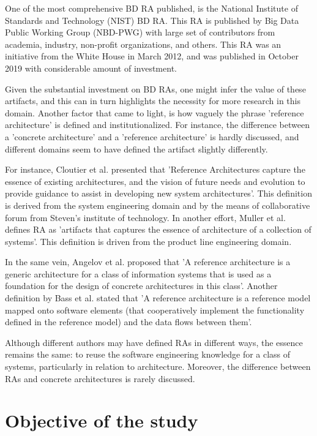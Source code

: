 \documentclass{ieeeaccess}
\begin{document}
One of the most comprehensive BD RA published, is the National Institute of Standards and Technology (NIST) BD RA. This RA is published by Big Data Public Working Group (NBD-PWG) with large set of contributors from academia, industry, non-profit organizations, and others. This RA was an initiative from the White House in March 2012, and was published in October 2019 with considerable amount of investment. 

Given the substantial investment on BD RAs, one might infer the value of these artifacts, and this can in turn highlights the necessity for more research in this domain. Another factor that came to light, is how vaguely the phrase 'reference architecture' is defined and institutionalized. For instance, the difference between a 'concrete architecture' and a 'reference architecture' is hardly discussed, and different domains seem to have defined the artifact slightly differently. 

For instance, Cloutier et al. \cite{Cloutier} presented that 'Reference Architectures capture the essence of existing architectures, and the vision of future needs and evolution to provide guidance to assist in developing new system architectures'. This definition is derived from the system engineering domain and by the means of collaborative forum from Steven's institute of technology. In another effort, Muller et al. \cite{muller2008reference} defines RA as 'artifacts that captures the essence of architecture of a collection of systems'. This definition is driven from the product line engineering domain. 

In the same vein, Angelov et al. \cite{angelov2009classification} proposed that 'A reference architecture is a generic architecture for a class of information systems that is used as a foundation for the design of concrete architectures in this class'. Another definition by Bass et al. \cite{Bass} stated that 'A reference architecture is a reference model mapped onto software elements (that cooperatively implement the functionality defined in the reference model) and the data flows between them'. 

Although different authors may have defined RAs in different ways, the essence remains the same: to reuse the software engineering knowledge for a class of systems, particularly in relation to architecture. Moreover, the difference between RAs and concrete architectures is rarely discussed. 

\section{Objective of the study}
\end{document}

